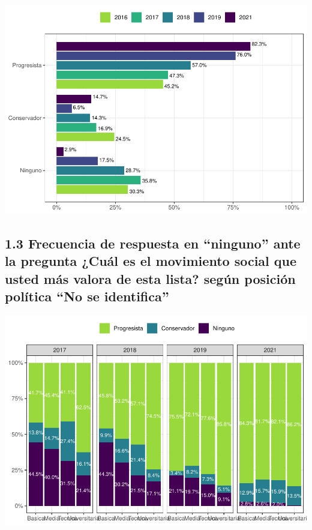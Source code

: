 \documentclass[
  12pt,
  openany]{book}
\begin{document}
\includegraphics{reporte-elsoc_files/figure-latex/unnamed-chunk-9-1.pdf}

\hypertarget{frecuencia-de-respuesta-en-ninguno-ante-la-pregunta-cuuxe1l-es-el-movimiento-social-que-usted-muxe1s-valora-de-esta-lista-seguxfan-posiciuxf3n-poluxedtica-no-se-identifica}{%
\subsection{1.3 Frecuencia de respuesta en ``ninguno'' ante la pregunta ¿Cuál es el movimiento social que usted más valora de esta lista? según posición política ``No se identifica''}\label{frecuencia-de-respuesta-en-ninguno-ante-la-pregunta-cuuxe1l-es-el-movimiento-social-que-usted-muxe1s-valora-de-esta-lista-seguxfan-posiciuxf3n-poluxedtica-no-se-identifica}}

\includegraphics{reporte-elsoc_files/figure-latex/unnamed-chunk-11-1.pdf}
\end{document}
